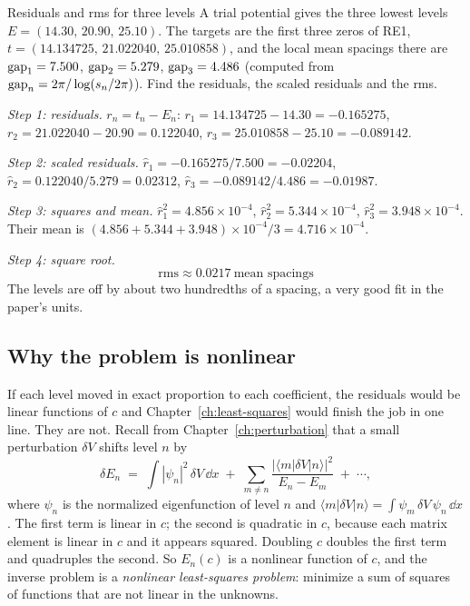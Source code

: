 \begin{sample}{Residuals and rms for three levels}
A trial potential gives the three lowest levels $E=(14.30,\,20.90,\,25.10)$. The targets are the first three zeros of RE1, $t=(14.134725,\,21.022040,\,25.010858)$, and the local mean spacings there are $\mathrm{gap}_1=7.500$, $\mathrm{gap}_2=5.279$, $\mathrm{gap}_3=4.486$ (computed from $\mathrm{gap}_n=2\pi/\log(s_n/2\pi)$). Find the residuals, the scaled residuals and the rms.

\emph{Step 1: residuals.} $r_n=t_n-E_n$: $r_1=14.134725-14.30=-0.165275$, $r_2=21.022040-20.90=0.122040$, $r_3=25.010858-25.10=-0.089142$.

\emph{Step 2: scaled residuals.} $\hat r_1=-0.165275/7.500=-0.02204$, $\hat r_2=0.122040/5.279=0.02312$, $\hat r_3=-0.089142/4.486=-0.01987$.

\emph{Step 3: squares and mean.} $\hat r_1^2=4.856\times10^{-4}$, $\hat r_2^2=5.344\times10^{-4}$, $\hat r_3^2=3.948\times10^{-4}$. Their mean is $(4.856+5.344+3.948)\times10^{-4}/3=4.716\times10^{-4}$.

\emph{Step 4: square root.}
\[
\boxed{\mathrm{rms}\approx 0.0217\ \text{mean spacings}}
\]
The levels are off by about two hundredths of a spacing, a very good fit in the paper's units.
\end{sample}

\subsection{Why the problem is nonlinear}

If each level moved in exact proportion to each coefficient, the residuals would be linear functions of $c$ and Chapter~\ref{ch:least-squares} would finish the job in one line. They are not. Recall from Chapter~\ref{ch:perturbation} that a small perturbation $\delta V$ shifts level $n$ by
\begin{equation}
\delta E_n \;=\; \int|\psi_n|^2\,\delta V\,\dd x \;+\; \sum_{m\neq n}\frac{\bigl|\langle m|\delta V|n\rangle\bigr|^2}{E_n-E_m} \;+\;\cdots,
\label{eq:fitting-pt}
\end{equation}
where $\psi_n$ is the normalized eigenfunction of level $n$ and $\langle m|\delta V|n\rangle=\int\psi_m\,\delta V\,\psi_n\,\dd x$. The first term is linear in $c$; the second is quadratic in $c$, because each matrix element is linear in $c$ and it appears squared. Doubling $c$ doubles the first term and quadruples the second. So $E_n(c)$ is a nonlinear function of $c$, and the inverse problem is a \emph{nonlinear least-squares problem}: minimize a sum of squares of functions that are not linear in the unknowns.

